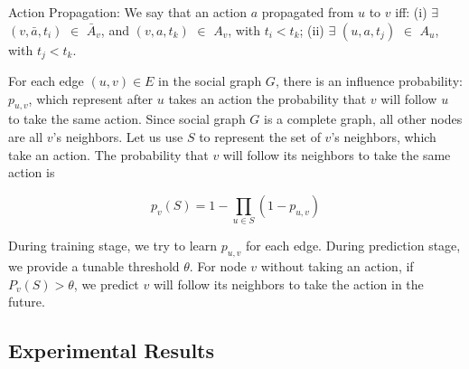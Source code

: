 \begin{definition}{Action Propagation:}
We say that an action $a$ propagated from $u$ to $v$ iff: (i) $\exists$ $(v, \bar{a}, t_i)$ $\in$ $\bar{A}_v$, 
and $(v, a, t_k)$ $\in$ $A_v$, with $t_i < t_k$; (ii) $\exists$ $(u, a, t_j)$ $\in$ $A_u$, with $t_j < t_k$. 
\end{definition}

For each edge $(u, v) \in E$ in the social graph $G$, 
there is an influence probability: $p_{u,v}$,
which represent after $u$ takes an action the probability that $v$ will follow $u$ to take the same action. 
Since social graph $G$ is a complete graph, 
all other nodes are all $v$'s neighbors. 
Let us use $S$ to represent the set of $v$'s neighbors, which take an action. 
The probability that $v$ will follow its neighbors to take the same action is

$$p_v(S) = 1 - \prod\limits_{u \in S}(1 - p_{u,v})$$

During training stage, we try to learn $p_{u,v}$ for each edge. 
During prediction stage, we provide a tunable threshold $\theta$. 
For node $v$ without taking an action, 
if $P_v(S)>\theta$, 
we predict $v$ will follow its neighbors to take the action in the future. 



\subsection{Experimental Results}